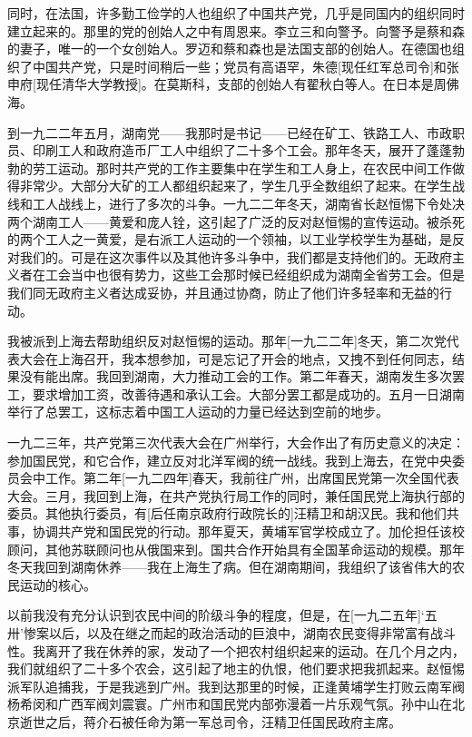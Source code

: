 \documentclass[10pt]{book}
\begin{document}
同时，在法国，许多勤工俭学的人也组织了中国共产党，几乎是同国内的组织同时建立起来的。那里的党的创始人之中有周恩来。李立三和向警予。向警予是蔡和森的妻子，唯一的一个女创始人。罗迈和蔡和森也是法国支部的创始人。在德国也组织了中国共产党，只是时间稍后一些；党员有高语罕，朱德[现任红军总司令]和张申府[现任清华大学教授]。在莫斯科，支部的创始人有翟秋白等人。在日本是周佛海。

到一九二二年五月，湖南党——我那时是书记——已经在矿工、铁路工人、市政职员、印刷工人和政府造币厂工人中组织了二十多个工会。那年冬天，展开了蓬蓬勃勃的劳工运动。那时共产党的工作主要集中在学生和工人身上，在农民中间工作做得非常少。大部分大矿的工人都组织起来了，学生几乎全数组织了起来。在学生战线和工人战线上，进行了多次的斗争。一九二二年冬天，湖南省长赵恒惕下令处决两个湖南工人——黄爱和庞人铨，这引起了广泛的反对赵恒惕的宣传运动。被杀死的两个工人之一黄爱，是右派工人运动的一个领袖，以工业学校学生为基础，是反对我们的。可是在这次事件以及其他许多斗争中，我们都是支持他们的。无政府主义者在工会当中也很有势力，这些工会那时候已经组织成为湖南全省劳工会。但是我们同无政府主义者达成妥协，并且通过协商，防止了他们许多轻率和无益的行动。

我被派到上海去帮助组织反对赵恒惕的运动。那年[一九二二年]冬天，第二次党代表大会在上海召开，我本想参加，可是忘记了开会的地点，又拽不到任何同志，结果没有能出席。我回到湖南，大力推动工会的工作。第二年春天，湖南发生多次罢工，要求增加工资，改善待遇和承认工会。大部分罢工都是成功的。五月一日湖南举行了总罢工，这标志着中国工人运动的力量已经达到空前的地步。

一九二三年，共产党第三次代表大会在广州举行，大会作出了有历史意义的决定：参加国民党，和它合作，建立反对北洋军阀的统一战线。我到上海去，在党中央委员会中工作。第二年[一九二四年]春天，我前往广州，出席国民党第一次全国代表大会。三月，我回到上海，在共产党执行局工作的同时，兼任国民党上海执行部的委员。其他执行委员，有[后任南京政府行政院长的]汪精卫和胡汉民。我和他们共事，协调共产党和国民党的行动。那年夏天，黄埔军官学校成立了。加伦担任该校顾问，其他苏联顾问也从俄国来到。国共合作开始具有全国革命运动的规模。那年冬天我回到湖南休养——我在上海生了病。但在湖南期间，我组织了该省伟大的农民运动的核心。

以前我没有充分认识到农民中间的阶级斗争的程度，但是，在[一九二五年]‘五卅’惨案以后，以及在继之而起的政治活动的巨浪中，湖南农民变得非常富有战斗性。我离开了我在休养的家，发动了一个把农村组织起来的运动。在几个月之内，我们就组织了二十多个农会，这引起了地主的仇恨，他们要求把我抓起来。赵恒惕派军队追捕我，于是我逃到广州。我到达那里的时候，正逢黄埔学生打败云南军阀杨希闵和广西军阀刘震寰。广州市和国民党内部弥漫着一片乐观气氛。孙中山在北京逝世之后，蒋介石被任命为第一军总司令，汪精卫任国民政府主席。
\end{document}
